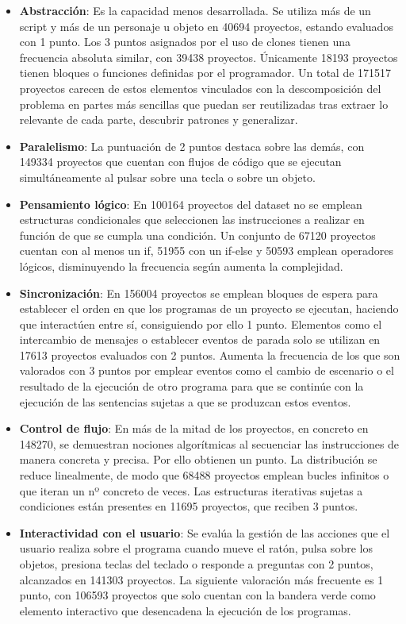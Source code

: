 \documentclass[a4paper, 12pt]{book}
\begin{document}
\begin{itemize}    
    \item \textbf{Abstracción}: Es la capacidad menos desarrollada. Se utiliza más de un script y más de un personaje u objeto en 40694 proyectos, estando evaluados con 1 punto. Los 3 puntos asignados por el uso de clones tienen una frecuencia absoluta similar, con 39438 proyectos. Únicamente 18193 proyectos tienen bloques o funciones definidas por el programador. Un total de 171517 proyectos carecen de estos elementos vinculados con la descomposición del problema en partes más sencillas que puedan ser reutilizadas tras extraer lo relevante de cada parte, descubrir patrones y generalizar.    
    \item \textbf{Paralelismo}: La puntuación de 2 puntos destaca sobre las demás, con 149334 proyectos que cuentan con flujos de código que se ejecutan simultáneamente al pulsar sobre una tecla o sobre un objeto.    
    \item \textbf{Pensamiento lógico}: En 100164 proyectos del dataset no se emplean estructuras condicionales que seleccionen las instrucciones a realizar en función de que se cumpla una condición. Un conjunto de 67120 proyectos cuentan con al menos un if, 51955 con un if-else y 50593 emplean operadores lógicos, disminuyendo la frecuencia según aumenta la complejidad.    
    \item \textbf{Sincronización}: En 156004 proyectos se emplean bloques de espera para establecer el orden en que los programas de un proyecto se ejecutan, haciendo que interactúen entre sí, consiguiendo por ello 1 punto. Elementos como el intercambio de mensajes o establecer eventos de parada solo se utilizan en 17613 proyectos evaluados con 2 puntos. Aumenta la frecuencia de los que son valorados con 3 puntos por emplear eventos como el cambio de escenario o el resultado de la ejecución de otro programa para que se continúe con la ejecución de las sentencias sujetas a que se produzcan estos eventos.    
    \item \textbf{Control de flujo}: En más de la mitad de los proyectos, en concreto en 148270, se demuestran nociones algorítmicas al secuenciar las instrucciones de manera concreta y precisa. Por ello obtienen un punto. La distribución se reduce linealmente, de modo que 68488 proyectos emplean bucles infinitos o que iteran un nº concreto de veces. Las estructuras iterativas sujetas a condiciones están presentes en 11695 proyectos, que reciben 3 puntos.  
    \item \textbf{Interactividad con el usuario}: Se evalúa la gestión de las acciones que el usuario realiza sobre el programa cuando mueve el ratón, pulsa sobre los objetos, presiona teclas del teclado o responde a preguntas con 2 puntos, alcanzados en 141303 proyectos. La siguiente valoración más frecuente es 1 punto, con 106593 proyectos que solo cuentan con la bandera verde como elemento interactivo que desencadena la ejecución de los programas.    

\end{itemize}
\end{document}
